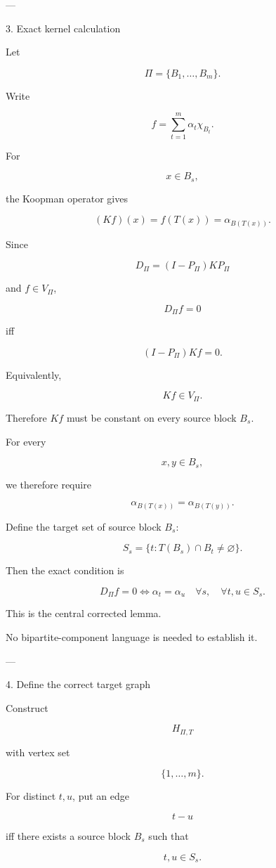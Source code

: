 ---

3. Exact kernel calculation

Let

\[
\Pi=\{B_1,\ldots,B_m\}.
\]

Write

\[
f=\sum_{t=1}^m\alpha_t\chi_{B_t}.
\]

For

\[
x\in B_s,
\]

the Koopman operator gives

\[
(Kf)(x)
=
f(T(x))
=
\alpha_{B(T(x))}.
\]

Since

\[
D_\Pi=(I-P_\Pi)KP_\Pi
\]

and \(f\in V_\Pi\),

\[
D_\Pi f=0
\]

iff

\[
(I-P_\Pi)Kf=0.
\]

Equivalently,

\[
Kf\in V_\Pi.
\]

Therefore \(Kf\) must be constant on every source block \(B_s\).

For every

\[
x,y\in B_s,
\]

we therefore require

\[
\alpha_{B(T(x))}
=
\alpha_{B(T(y))}.
\]

Define the target set of source block \(B_s\):

\[
S_s
=
\{t:T(B_s)\cap B_t\neq\varnothing\}.
\]

Then the exact condition is

\[
\boxed{
D_\Pi f=0
\iff
\alpha_t=\alpha_u
\quad
\forall s,\quad
\forall t,u\in S_s.
}
\]

This is the central corrected lemma.

No bipartite-component language is needed to establish it.


---

4. Define the correct target graph

Construct

\[
H_{\Pi,T}
\]

with vertex set

\[
\{1,\ldots,m\}.
\]

For distinct \(t,u\), put an edge

\[
t-u
\]

iff there exists a source block \(B_s\) such that

\[
t,u\in S_s.
\]

